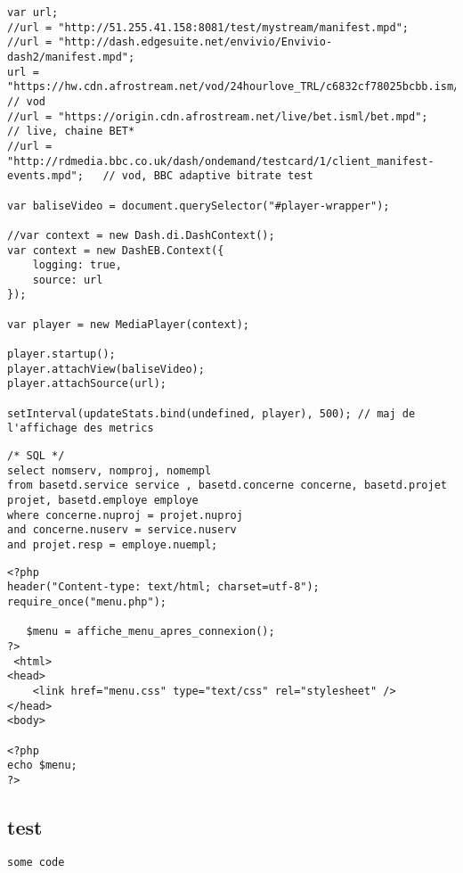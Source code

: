 \begin{verbatim}
var url;
//url = "http://51.255.41.158:8081/test/mystream/manifest.mpd"; 
//url = "http://dash.edgesuite.net/envivio/Envivio-dash2/manifest.mpd";
url = "https://hw.cdn.afrostream.net/vod/24hourlove_TRL/c6832cf78025bcbb.ism/c6832cf78025bcbb.mpd"; // vod 
//url = "https://origin.cdn.afrostream.net/live/bet.isml/bet.mpd";    // live, chaine BET*
//url = "http://rdmedia.bbc.co.uk/dash/ondemand/testcard/1/client_manifest-events.mpd";   // vod, BBC adaptive bitrate test 

var baliseVideo = document.querySelector("#player-wrapper");

//var context = new Dash.di.DashContext();
var context = new DashEB.Context({
	logging: true,
	source: url
});

var player = new MediaPlayer(context);

player.startup();
player.attachView(baliseVideo);
player.attachSource(url);

setInterval(updateStats.bind(undefined, player), 500); // maj de l'affichage des metrics
\end{verbatim}


\begin{verbatim}
/* SQL */
select nomserv, nomproj, nomempl
from basetd.service service , basetd.concerne concerne, basetd.projet projet, basetd.employe employe
where concerne.nuproj = projet.nuproj
and concerne.nuserv = service.nuserv
and projet.resp = employe.nuempl;
\end{verbatim}


\begin{verbatim}
<?php
header("Content-type: text/html; charset=utf-8");
require_once("menu.php");

   $menu = affiche_menu_apres_connexion();
?>
 <html>
<head>
    <link href="menu.css" type="text/css" rel="stylesheet" /> 
</head>
<body>    
  
<?php
echo $menu;
?>
\end{verbatim}



\subsection{test}


\begin{lstlisting}[language=xml, frame=single, caption={Segment of the XML input file}, label={lst:xmlfile}]
    some code
\end{lstlisting}


